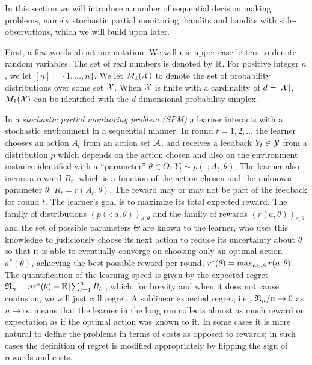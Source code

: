 
In this section we will introduce a number of sequential decision making problems,
namely stochastic partial monitoring, bandits and bandits with side-observations, which we will build upon later.

First, a few words about our notation: We will use upper case letters to denote random variables.
The set of real numbers is denoted by $\mathbb{R}$. For positive integer $n$, we let
$[n] = \{1,\dots,n\}$. %
We let $M_1(\mathcal{X})$ to denote the set of probability distributions over some set $\mathcal{X}$.
When $\mathcal{X}$ is finite with a cardinality of $d \doteq |\mathcal{X}|$, 
$M_1(\mathcal{X})$ can be identified with the $d$-dimensional probability simplex.

%
In a \emph{stochastic partial monitoring problem (SPM)} a learner interacts with a stochastic environment in a sequential manner.
In round $t=1,2,\dots$ the learner chooses an action $A_t$ from an action set $\mathcal{A}$, and receives a feedback $Y_t\in \mathcal{Y}$
from a distribution $p$ which depends on the action chosen and also on the environment instance identified
with a ``parameter'' $\theta\in\Theta$:
$Y_t \sim p(\cdot;A_t,\theta)$. 
The learner also incurs a reward $R_t$, which is a function of the action chosen and the unknown parameter $\theta$:
$R_t = r(A_t,\theta)$. 
The reward may or may not be part of the feedback for round $t$.
The learner's goal is to maximize its total expected reward.
The family of distributions $(p(\cdot;a,\theta))_{a,\theta}$ and the family of rewards $(r(a,\theta))_{a,\theta}$
and the set of possible parameters $\Theta$ are known to the learner, who uses this knowledge to judiciously choose
its next action to reduce its uncertainty about $\theta$ so that it is able to eventually converge on choosing only an 
optimal action $a^*(\theta)$, achieving the best possible reward per round, $r^*(\theta) = \max_{a\in \mathcal{A}} r(a,\theta)$.
The quantification of the learning speed is given by the expected regret 
$\mathfrak{R}_n = n r^*(\theta) - \mathbb{E}\left[\sum_{t=1}^n R_t\right]$, which, for brevity and when it does not cause confusion, 
we will just call regret.
A sublinear expected regret, i.e., $\mathfrak{R}_n/n \to 0$ as $n\to \infty$ means that the learner in the long run collects
almost as much reward on expectation as if the optimal action was known to it.
In some cases it is more natural to define the problems in terms of costs as opposed to rewards;
in such cases the definition of regret is modified appropriately by flipping the sign of rewards and costs. 

